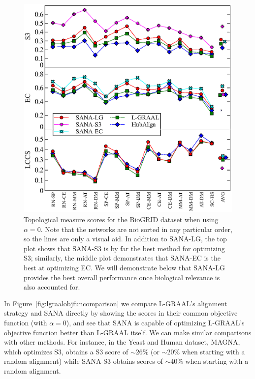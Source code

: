 \documentclass{bioinfo}
\begin{document}
\begin{figure}
\centering
\includegraphics[width=0.99\linewidth]{biogridBeta0.eps}
\caption{Topological measure scores for the BioGRID dataset when using $\alpha=0$. Note that the networks are not sorted in any particular order, so the lines are only a visual aid. In addition to SANA-LG, the top plot shows that SANA-S3 is by far the best method for optimizing S3; similarly, the middle plot demonstrates that SANA-EC is the best at optimizing EC. We will demonstrate below that SANA-LG provides the best overall performance once biological relevance is also accounted for.}
\label{fig:biogrid_alpha0}
\end{figure}

In Figure~\ref{fig:lgraalobjfuncomparison} we compare L-GRAAL's alignment strategy and SANA directly by showing the scores in their common objective function (with $\alpha=0$), and see that SANA is capable of optimizing L-GRAAL's objective function better than L-GRAAL itself. We can make similar comparisons with other methods. For instance, in the Yeast and Human dataset, MAGNA, which optimizes S3, obtains a S3 score of ${\sim}26\%$ (or ${\sim}20\%$ when starting with a random alignment) while SANA-S3 obtains scores of ${\sim}40\%$ when starting with a random alignment.
\end{document}
